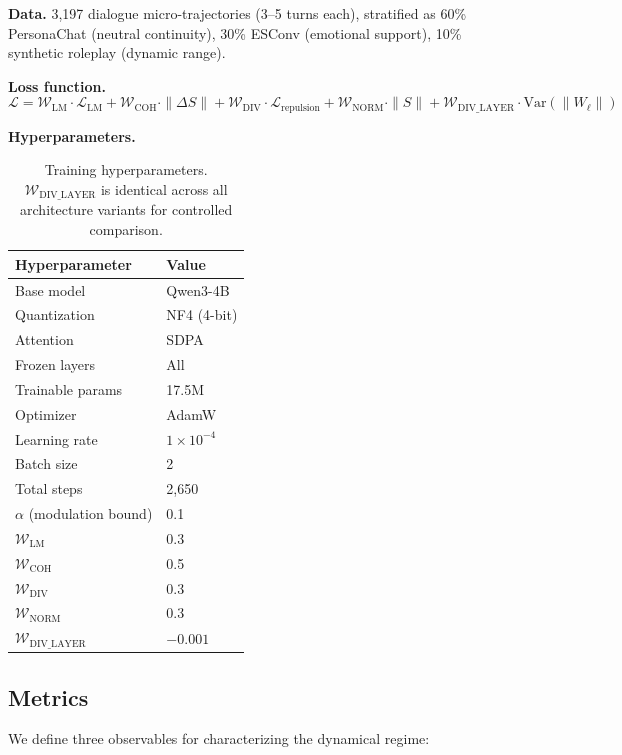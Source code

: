 \documentclass[11pt,a4paper]{article}
\begin{document}
\textbf{Data.} 3,197 dialogue micro-trajectories (3--5 turns each), stratified as
60\% PersonaChat (neutral continuity), 30\% ESConv (emotional support), 10\%
synthetic roleplay (dynamic range).

\textbf{Loss function.}
$$\mathcal{L} = \mathcal{W}_{\mathrm{LM}}\cdot\mathcal{L}_{\mathrm{LM}} + \mathcal{W}_{\mathrm{COH}}\cdot\|\Delta S\| + \mathcal{W}_{\mathrm{DIV}}\cdot\mathcal{L}_{\mathrm{repulsion}} + \mathcal{W}_{\mathrm{NORM}}\cdot\|S\| + \mathcal{W}_{\mathrm{DIV\_LAYER}}\cdot\mathrm{Var}(\|W_\ell\|)$$

\textbf{Hyperparameters.}

\begin{table}[h]
\centering
\begin{tabular}{ll}
\toprule
\textbf{Hyperparameter} & \textbf{Value} \\
\midrule
Base model         & Qwen3-4B \\
Quantization       & NF4 (4-bit) \\
Attention          & SDPA \\
Frozen layers      & All \\
Trainable params   & 17.5M \\
Optimizer          & AdamW \\
Learning rate      & $1 \times 10^{-4}$ \\
Batch size         & 2 \\
Total steps        & 2,650 \\
$\alpha$ (modulation bound) & 0.1 \\
$\mathcal{W}_{\mathrm{LM}}$ & 0.3 \\
$\mathcal{W}_{\mathrm{COH}}$ & 0.5 \\
$\mathcal{W}_{\mathrm{DIV}}$ & 0.3 \\
$\mathcal{W}_{\mathrm{NORM}}$ & 0.3 \\
$\mathcal{W}_{\mathrm{DIV\_LAYER}}$ & $-0.001$ \\
\bottomrule
\end{tabular}
\caption{Training hyperparameters. $\mathcal{W}_{\mathrm{DIV\_LAYER}}$ is identical
across all architecture variants for controlled comparison.}
\end{table}

\subsection{Metrics}

We define three observables for characterizing the dynamical regime:
\end{document}
